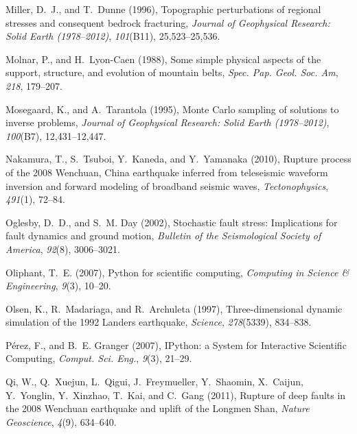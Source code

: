 \documentclass[twocolumn,jgrga]{AGUTeX}
\begin{document}
\begin{article}
{{\begin{thebibliography}{85}
Miller, D.~J., and T.~Dunne (1996), Topographic perturbations of regional
  stresses and consequent bedrock fracturing, \textit{Journal of Geophysical
  Research: Solid Earth (1978--2012)}, \textit{101}(B11), 25,523--25,536.

Molnar, P., and H.~Lyon-Caen (1988), Some simple physical aspects of the
  support, structure, and evolution of mountain belts, \textit{Spec. Pap. Geol.
  Soc. Am}, \textit{218}, 179--207.

Mosegaard, K., and A.~Tarantola (1995), Monte {C}arlo sampling of solutions to
  inverse problems, \textit{Journal of Geophysical Research: Solid Earth
  (1978--2012)}, \textit{100}(B7), 12,431--12,447.

Nakamura, T., S.~Tsuboi, Y.~Kaneda, and Y.~Yamanaka (2010), Rupture process of
  the 2008 {W}enchuan, {C}hina earthquake inferred from teleseismic waveform
  inversion and forward modeling of broadband seismic waves,
  \textit{Tectonophysics}, \textit{491}(1), 72--84.

Oglesby, D.~D., and S.~M. Day (2002), Stochastic fault stress: {I}mplications
  for fault dynamics and ground motion, \textit{Bulletin of the Seismological
  Society of America}, \textit{92}(8), 3006--3021.

Oliphant, T.~E. (2007), Python for scientific computing, \textit{Computing in
  Science \& Engineering}, \textit{9}(3), 10--20.

Olsen, K., R.~Madariaga, and R.~Archuleta (1997), Three-dimensional dynamic
  simulation of the 1992 {L}anders earthquake, \textit{Science},
  \textit{278}(5339), 834--838.

P\'erez, F., and B.~E. Granger (2007), {IP}ython: a {S}ystem for {I}nteractive
  {S}cientific {C}omputing, \textit{{C}omput. {S}ci. {E}ng.}, \textit{9}(3),
  21--29.

Qi, W., Q.~Xuejun, L.~Qigui, J.~Freymueller, Y.~Shaomin, X.~Caijun, Y.~Yonglin,
  Y.~Xinzhao, T.~Kai, and C.~Gang (2011), Rupture of deep faults in the 2008
  {W}enchuan earthquake and uplift of the {L}ongmen {S}han, \textit{Nature
  Geoscience}, \textit{4}(9), 634--640.


\end{thebibliography}}}
\end{article}
\end{document}
